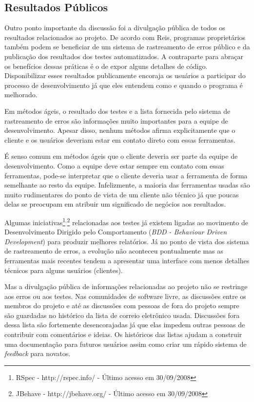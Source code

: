 \subsection{Resultados Públicos}
\label{subsec:publicity}

Outro ponto importante da discussão foi a divulgação pública de todos
os resultados relacionados ao projeto. De acordo com Reis, programas
proprietários também podem se beneficiar de um sistema de rastreamento
de erros público e da publicação dos resultados dos testes
automatizados. A contraparte para abraçar os benefícios dessas
práticas é o de expor alguns detalhes de código. Disponibilizar esses
resultados publicamente encoraja os usuários a participar do processo
de desenvolvimento já que eles entendem como e quando o programa é
melhorado.

Em métodos ágeis, o resultado dos testes e a lista fornecida pelo
sistema de rastreamento de erros são informações muito importantes
para a equipe de desenvolvimento. Apesar disso, nenhum métodos afirma
explicitamente que o cliente e os usuários deveriam estar em contato
direto com essas ferramentas.

É senso comum em métodos ágeis que o cliente deveria ser parte da
equipe de desenvolvimento. Como a equipe deve estar sempre em contato
com essas ferramentas, pode-se interpretar que o cliente deveria usar
a ferramenta de forma semelhante ao resto da equipe. Infelizmente, a
maioria das ferramentas usadas são muito rudimentares do ponto de
vista de um cliente não técnico já que poucas delas se preocupam em
atribuir um significado de negócios aos resultados.

Algumas iniciativas\footnote{RSpec - http://rspec.info/ - Último
  acesso em 30/09/2008}$^{, }$\footnote{JBehave - http://jbehave.org/
  - Último acesso em 30/09/2008} relacionadas aos testes já existem
ligadas ao movimento de Desenvolvimento Dirigido pelo Comportamento
(\emph{BDD - Behaviour Driven Development}) \cite{North2006} para
produzir melhores relatórios. Já no ponto de vista dos sistema de
rastreamento de erros, a evolução não aconteceu pontualmente mas as
ferramentas mais recentes tendem a apresentar uma interface com menos
detalhes técnicos para alguns usuários (clientes).

Mas a divulgação pública de informações relacionadas ao projeto não se
restringe aos erros ou aos testes. Nas comunidades de software livre,
as discussões entre os membros do projeto e até as discussões com
pessoas de fora do projeto sempre são guardadas no histórico da lista
de correio eletrônico usada. Discussões fora dessa lista são
fortemente desencorajadas já que elas impedem outras pessoas de
contribuir com comentários e ideias. Os históricos das listas ajudam a
construir uma documentação para futuros usuários assim como criar um
rápido sistema de \emph{feedback} para novatos.


